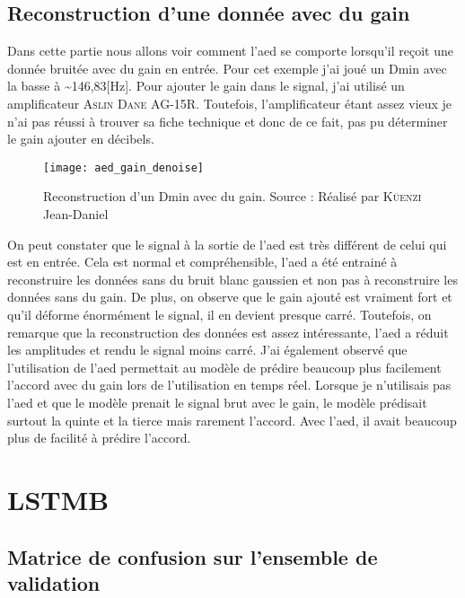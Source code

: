 \subsection{Reconstruction d'une donnée avec du gain}

Dans cette partie nous allons voir comment l'\gls{aed} se comporte lorsqu'il reçoit une donnée bruitée avec du gain en entrée. Pour cet exemple j'ai joué un Dmin avec la basse à \textasciitilde146,83[Hz]. Pour ajouter le gain dans le signal, j'ai utilisé un amplificateur \textsc{Aslin Dane AG-15R}. Toutefois, l'amplificateur étant assez vieux je n'ai pas réussi à trouver sa fiche technique et donc de ce fait, pas pu déterminer le gain ajouter en décibels.

\begin{figure}[H]
	\centering
	\texttt{[image: aed\_gain\_denoise]}
	\caption[Reconstruction d'un Dmin avec du gain]{Reconstruction d'un Dmin avec du gain. Source : Réalisé par \textsc{Küenzi} Jean-Daniel}
	\label{fig:aed_gain_denoise}
\end{figure}

On peut constater que le signal à la sortie de l'\gls{aed} est très différent de celui qui est en entrée. Cela est normal et compréhensible, l'\gls{aed} a été entrainé à reconstruire les données sans du bruit blanc gaussien et non pas à reconstruire les données sans du gain. De plus, on observe que le gain ajouté est vraiment fort et qu'il déforme énormément le signal, il en devient presque carré. Toutefois, on remarque que la reconstruction des données est assez intéressante,  l'\gls{aed} a réduit les amplitudes et rendu le signal moins carré. J'ai également observé que l'utilisation de l'\gls{aed} permettait au modèle de prédire beaucoup plus facilement l'accord avec du gain lors de l'utilisation en temps réel. Lorsque je n'utilisais pas l'\gls{aed} et que le modèle prenait le signal brut avec le gain, le modèle prédisait surtout la quinte et la tierce mais rarement l'accord. Avec l'\gls{aed}, il avait beaucoup plus de facilité à prédire l'accord.

\section{LSTMB}
\label{sec:7.2}

\subsection{Matrice de confusion sur l'ensemble de validation}

